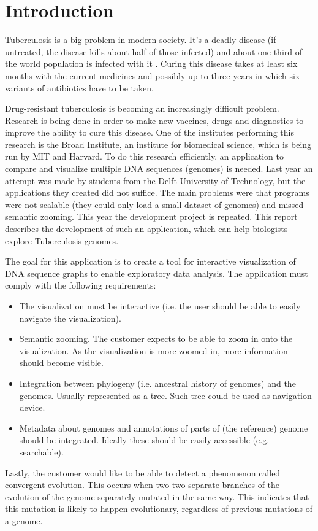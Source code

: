 \chapter{Introduction}
\par
Tuberculosis is a big problem in modern society. It’s a deadly disease (if untreated, the disease kills about half of those infected) and about one third of the world population is infected with it \citep{whoTB}. Curing this disease takes at least six months with the current medicines and possibly up to three years in which six variants of antibiotics have to be taken\citep{p1TB}.
\par
Drug-resistant tuberculosis is becoming an increasingly difficult problem. Research is being done in order to make new vaccines, drugs and diagnostics to improve the ability to cure this disease. One of the institutes performing this research is the Broad Institute, an institute for biomedical science, which is being run by MIT and Harvard. To do this research efficiently, an application to compare and visualize multiple DNA sequences (genomes) is needed. Last year an attempt was made by students from the Delft University of Technology, but the applications they created did not suffice. The main problems were that programs were not scalable (they could only load a small dataset of genomes) and missed semantic zooming. This year the development project is repeated. This report describes the development of such an application, which can help biologists explore Tuberculosis genomes.
\par
The goal for this application is to create a tool for interactive visualization of DNA sequence graphs to enable exploratory data analysis. The application must comply with the following requirements:
\begin{itemize}
	\item The visualization must be interactive (i.e. the user should be able to easily navigate the visualization).
	\item Semantic zooming. The customer expects to be able to zoom in onto the visualization. As the visualization is more zoomed in, more information should become visible.
	\item Integration between phylogeny (i.e. ancestral history of genomes) and the genomes. Usually represented as a tree. Such tree could be used as navigation device.
	\item Metadata about genomes and annotations of parts of (the reference) genome should be integrated. Ideally these should be easily accessible (e.g. searchable).
\end{itemize}

Lastly, the customer would like to be able to detect a phenomenon called convergent evolution. This occurs when two two separate branches of the evolution of the genome separately mutated in the same way. This indicates that this mutation is likely to happen evolutionary, regardless of previous mutations of a genome.
